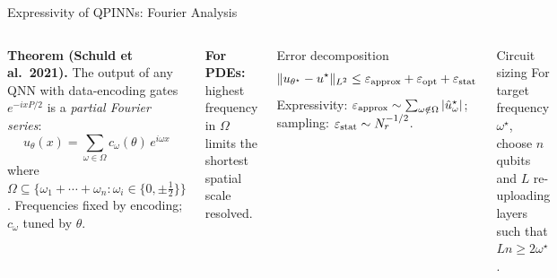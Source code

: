 \documentclass[aspectratio=169,11pt]{beamer}
\begin{document}
\begin{frame}{Expressivity of QPINNs: Fourier Analysis}
  \begin{columns}[T]
    \textbf{Theorem (Schuld et al.\ 2021).}
    The output of any QNN with data-encoding gates
    $e^{-ixP/2}$ is a \emph{partial Fourier series}:
    \[
      u_\theta(x)
      = \sum_{\omega\in\Omega}
        c_\omega(\theta)\,e^{i\omega x}
    \]
    where $\Omega\subseteq\{\omega_1{+}\cdots{+}\omega_n:
      \omega_i\in\{0,\pm\tfrac12\}\}$.
    Frequencies fixed by encoding; $c_\omega$ tuned by $\theta$.

    \textbf{For PDEs:} highest frequency in $\Omega$
    limits the shortest spatial scale resolved.

    \begin{block}{Error decomposition}
      \[
        \|u_{\theta^\star}-u^\star\|_{L^2}
        \leq
        \varepsilon_{\rm approx}
       +\varepsilon_{\rm opt}
       +\varepsilon_{\rm stat}
      \]
      Expressivity: $\varepsilon_{\rm approx}
       \sim \sum_{\omega\notin\Omega}|\hat{u}^\star_\omega|$;
      sampling: $\varepsilon_{\rm stat}\sim N_r^{-1/2}$.
    \end{block}
    \begin{alertblock}{Circuit sizing}
      For target frequency $\omega^\star$, choose
      $n$ qubits and $L$ re-uploading layers such that
      $Ln \geq 2\omega^\star$.
    \end{alertblock}
  \end{columns}
\end{frame}
\end{document}
